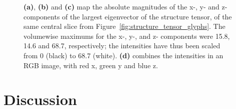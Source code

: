   \begin{figure}[htbp]
    \centering
    \caption{\textbf{(a)}, \textbf{(b)} and \textbf{(c)} map the absolute magnitudes of the x-, y- and z- components of the largest eigenvector of the structure tensor, of the same central slice from Figure~\ref{fig:structure_tensor_glyphs}. The volumewise maximums for the x-, y-, and z- components were 15.8, 14.6 and 68.7, respectively; the intensities have thus been scaled from 0 (black) to 68.7 (white). \textbf{(d)} combines the intensities in an RGB image, with red x, green y and blue z.}
    \label{fig:eigencomponents}
  \end{figure}
  

\section{Discussion} %
\label{sec:discussion}
  
